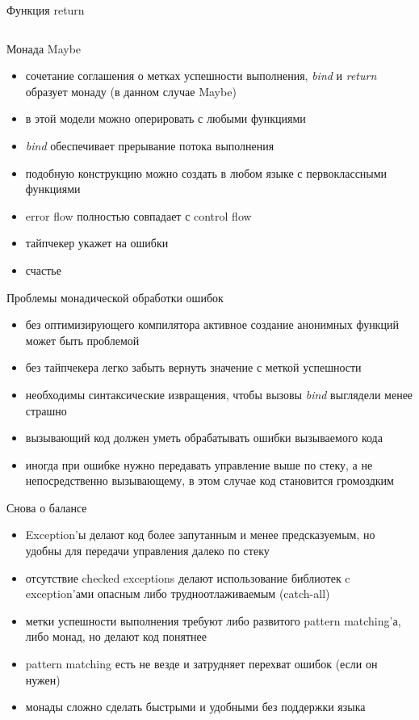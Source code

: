 \documentclass[10pt]{beamer}
\newcommand{\code}[4]{\inputminted[linenos, frame=none, firstline=#2, lastline=#3,
  framesep=10pt, bgcolor=lightgray]{#4}{#1}}
\begin{document}
\begin{frame}{Функция return}
  \code{code.py}{88}{93}{python}
\end{frame}

\begin{frame}{Монада Maybe}
  \begin{itemize}
  \item сочетание соглашения о метках успешности выполнения, \emph{bind} и \emph{return} образует монаду (в данном случае Maybe)
  \item в этой модели можно оперировать с любыми функциями
  \item \emph{bind} обеспечивает прерывание потока выполнения
  \item подобную конструкцию можно создать в любом языке с первоклассными функциями
  \item error flow полностью совпадает с control flow
  \item тайпчекер укажет на ошибки
  \item счастье
  \end{itemize}
\end{frame}

\begin{frame}{Проблемы монадической обработки ошибок}
  \begin{itemize}
  \item без оптимизирующего компилятора активное создание анонимных функций может быть проблемой
  \item без тайпчекера легко забыть вернуть значение с меткой успешности
  \item необходимы синтаксические извращения, чтобы вызовы \emph{bind} выглядели менее страшно
  \item вызывающий код должен уметь обрабатывать ошибки вызываемого кода
  \item иногда при ошибке нужно передавать управление выше по стеку, а не непосредственно вызывающему, в этом случае код становится громоздким
  \end{itemize}
\end{frame}

\begin{frame}{Снова о балансе}
  \begin{itemize}
  \item Exception'ы делают код более запутанным и менее предсказуемым, но удобны для передачи управления далеко по стеку
  \item отсутствие checked exceptions делают использование библиотек c exception'ами опасным либо трудноотлаживаемым (catch-all)
  \item метки успешности выполнения требуют либо развитого pattern matching'а, либо монад, но делают код понятнее
  \item pattern matching есть не везде и затрудняет перехват ошибок (если он нужен)
  \item монады сложно сделать быстрыми и удобными без поддержки языка
  \end{itemize}
\end{frame}
\end{document}
